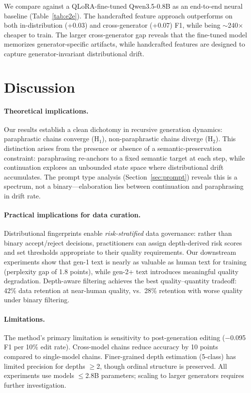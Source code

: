 \documentclass[letterpaper, 10pt]{article}
\begin{document}
We compare against a QLoRA-fine-tuned Qwen3.5-0.8B as an end-to-end neural baseline (Table~\ref{tab:e2e}).
The handcrafted feature approach outperforms on both in-distribution (+0.03) and cross-generator (+0.07) F1, while being $\sim$240$\times$ cheaper to train.
The larger cross-generator gap reveals that the fine-tuned model memorizes generator-specific artifacts, while handcrafted features are designed to capture generator-invariant distributional drift.

\section{Discussion}

\paragraph{Theoretical implications.}
Our results establish a clean dichotomy in recursive generation dynamics: paraphrastic chains converge (H$_1$), non-paraphrastic chains diverge (H$_2$).
This distinction arises from the presence or absence of a semantic-preservation constraint: paraphrasing re-anchors to a fixed semantic target at each step, while continuation explores an unbounded state space where distributional drift accumulates.
The prompt type analysis (Section~\ref{sec:prompt}) reveals this is a spectrum, not a binary---elaboration lies between continuation and paraphrasing in drift rate.

\paragraph{Practical implications for data curation.}
Distributional fingerprints enable \emph{risk-stratified} data governance: rather than binary accept/reject decisions, practitioners can assign depth-derived risk scores and set thresholds appropriate to their quality requirements.
Our downstream experiments show that gen-1 text is nearly as valuable as human text for training (perplexity gap of 1.8 points), while gen-2+ text introduces meaningful quality degradation.
Depth-aware filtering achieves the best quality--quantity tradeoff: 42\% data retention at near-human quality, vs.\ 28\% retention with worse quality under binary filtering.

\paragraph{Limitations.}
The method's primary limitation is sensitivity to post-generation editing ($-$0.095 F1 per 10\% edit rate).
Cross-model chains reduce accuracy by 10 points compared to single-model chains.
Finer-grained depth estimation (5-class) has limited precision for depths $\geq$2, though ordinal structure is preserved.
All experiments use models $\leq$2.8B parameters; scaling to larger generators requires further investigation.
\end{document}
